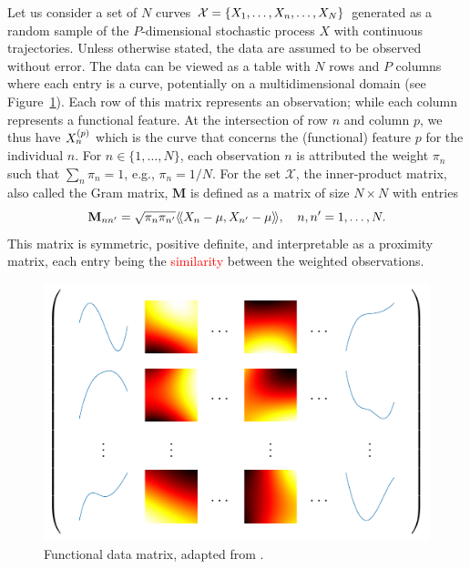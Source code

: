 Let us consider a set of $N$ curves $\mathcal{X} = \{X_1, \ldots, X_n, \ldots, X_N\}$ generated as a random sample of the $P$-dimensional stochastic process $X$ with continuous trajectories. Unless otherwise stated, the data are assumed to be observed without error. The data can be viewed as a table with $N$ rows and $P$ columns where each entry is a curve, potentially on a multidimensional domain (see Figure~\ref{fig:data_matrix}). Each row of this matrix represents an observation; while each column represents a functional feature. At the intersection of row $n$ and column $p$, we thus have $X_n^{(p)}$ which is the curve that concerns the (functional) feature $p$ for the individual $n$. For $n \in \{1, \dots, N\}$, each observation $n$ is attributed the weight $\pi_n$ such that $\sum_n \pi_n = 1$, e.g., $\pi_n = 1/N$. For the set $\mathcal{X}$, the inner-product matrix, also called the Gram matrix, $\mathbf{M}$ is defined as a matrix of size $N \times N$ with entries
\begin{equation}\label{eq:gram_mat}
    \mathbf{M}_{nn^\prime} = \sqrt{\pi_n \pi_{n^{\prime}}}\langle\!\langle X_n - \mu, X_{n^\prime} - \mu\rangle\!\rangle, \quad n, n^\prime = 1, \dots, N.
\end{equation}
This matrix is symmetric, positive definite, and interpretable as a proximity matrix, each entry being the \textcolor{red}{similarity} between the weighted observations.

\begin{figure}
    \centering
    \includegraphics[]{figures/data_matrix.pdf}
    \caption{Functional data matrix, adapted from \cite{berrenderoPrincipalComponentsMultivariate2011}.}
    \label{fig:data_matrix}
\end{figure}

